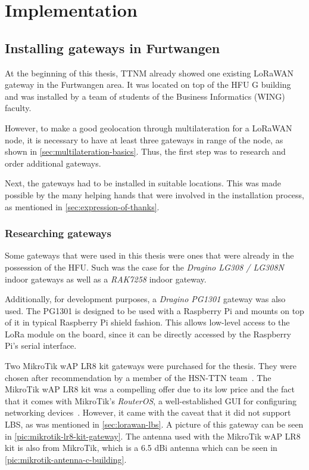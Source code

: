 \chapter{Implementation}

\section{Installing gateways in Furtwangen}

At the beginning of this thesis, \ac{TTNM} already showed one existing \ac{LoRaWAN} gateway in the Furtwangen area.
It was located on top of the \ac{HFU} G building and was installed by a team of students of the Business Informatics (WING) faculty.

However, to make a good geolocation through multilateration for a \ac{LoRaWAN} node, it is necessary to have at least three gateways in range of the node, as shown in \cref{sec:multilateration-basics}.
Thus, the first step was to research and order additional gateways.

Next, the gateways had to be installed in suitable locations.
This was made possible by the many helping hands that were involved in the installation process, as mentioned in \cref{sec:expression-of-thanks}.

\subsection{Researching gateways}

Some gateways that were used in this thesis were ones that were already in the possession of the \ac{HFU}.
Such was the case for the \emph{Dragino LG308 / LG308N} indoor gateways as well as a \emph{RAK7258} indoor gateway.

Additionally, for development purposes, a \emph{Dragino PG1301} gateway was also used.
The PG1301 is designed to be used with a Raspberry Pi and mounts on top of it in typical Raspberry Pi shield fashion.
This allows low-level access to the \ac{LoRa} module on the board, since it can be directly accessed by the Raspberry Pi's serial interface.

Two MikroTik wAP LR8 kit gateways were purchased for the thesis.
They were chosen after recommendation by a member of the \ac{HSN-TTN} team~\cite{hochschwarzwald_smart_net_-_thethingsnetwork_eingesetzte_nodate}.
The MikroTik wAP LR8 kit was a compelling offer due to its low price and the fact that it comes with MikroTik's \emph{RouterOS}, a well-established GUI for configuring networking devices~\cite{mikrotik_mikrotik_nodate}.
However, it came with the caveat that it did not support \ac{LBS}, as was mentioned in \cref{sec:lorawan-lbs}.
A picture of this gateway can be seen in \cref{pic:mikrotik-lr8-kit-gateway}.
The antenna used with the MikroTik wAP LR8 kit is also from MikroTik, which is a 6.5 dBi antenna which can be seen in \cref{pic:mikrotik-antenna-c-building}.

